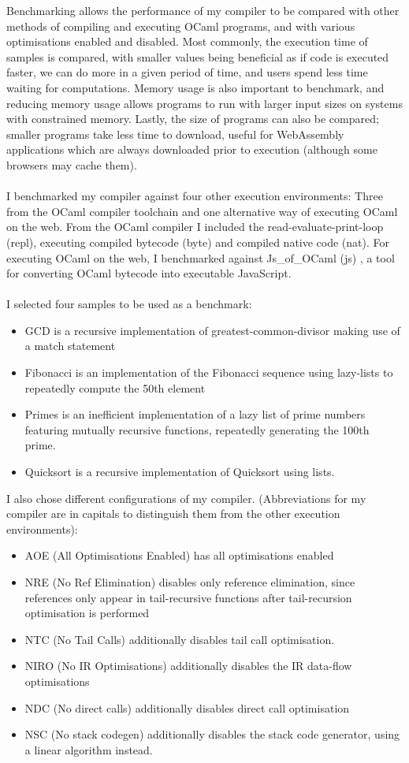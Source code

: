Benchmarking allows the performance of my compiler to be compared with other methods of compiling and executing OCaml programs, and with various optimisations enabled and disabled. Most commonly, the execution time of samples is compared, with smaller values being beneficial as if code is executed faster, we can do more in a given period of time, and users spend less time waiting for computations. Memory usage is also important to benchmark, and reducing memory usage allows programs to run with larger input sizes on systems with constrained memory. Lastly, the size of programs can also be compared; smaller programs take less time to download, useful for WebAssembly applications which are always downloaded prior to execution (although some browsers may cache them).
\\\\
I benchmarked my compiler against four other execution environments: Three from the OCaml compiler toolchain and one alternative way of executing OCaml on the web. From the OCaml compiler I included the read-evaluate-print-loop (repl), executing compiled bytecode (byte) and compiled native code (nat). For executing OCaml on the web, I benchmarked against Js\_of\_OCaml (js) \cite{Js_of_ocaml}, a tool for converting OCaml bytecode into executable JavaScript.
\\\\
I selected four samples to be used as a benchmark:
\begin{itemize}
	\item GCD is a recursive implementation of greatest-common-divisor making use of a match statement
	\item Fibonacci is an implementation of the Fibonacci sequence using lazy-lists to repeatedly compute the 50th element
	\item Primes is an inefficient implementation of a lazy list of prime numbers featuring mutually recursive functions, repeatedly generating the 100th prime.
	\item Quicksort is a recursive implementation of Quicksort using lists.
\end{itemize}
I also chose different configurations of my compiler. (Abbreviations for my compiler are in capitals to distinguish them from the other execution environments):
\begin{itemize}
	\item AOE (All Optimisations Enabled) has all optimisations enabled
	\item NRE (No Ref Elimination) disables only reference elimination, since references only appear in tail-recursive functions after tail-recursion optimisation is performed
	\item NTC (No Tail Calls) additionally disables tail call optimisation.
	\item NIRO (No IR Optimisations) additionally disables the IR data-flow optimisations
	\item NDC (No direct calls) additionally disables direct call optimisation
	\item NSC (No stack codegen) additionally disables the stack code generator, using a linear algorithm instead.
\end{itemize}
